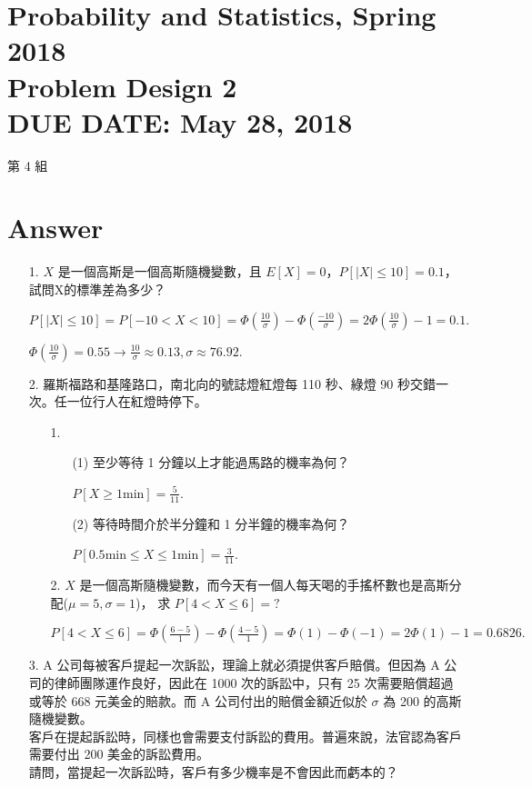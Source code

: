 \documentclass{article}
\newcommand{\hmwkClass}{Probability and Statistics, Spring 2018}
\newcommand{\hmwkTitle}{Problem Design 2}
\newcommand{\hmwkDueDate}{May 28, 2018}
\begin{document}
\thispagestyle{empty}
\section*{\hmwkClass \\
    \normalsize{\hmwkTitle} \\
    \normalsize{DUE DATE: \hmwkDueDate}
}

\hfill{第 4 組}


\section*{Answer}
\begin{enumerate}
    \item [1.] $X$ 是一個高斯是一個高斯隨機變數，且 $E[X] = 0$，$P[|X| \le 10] = 0.1$，試問X的標準差為多少？

    $P[|X| \le 10] = P[-10 < X < 10] = \Phi(\frac{10}{\sigma}) - \Phi(\frac{-10}{\sigma}) = 2\Phi(\frac{10}{\sigma}) - 1 = 0.1.$

    $\Phi(\frac{10}{\sigma}) = 0.55 \to \frac{10}{\sigma} \approx 0.13, \sigma \approx 76.92.$

    \item [2.] 羅斯福路和基隆路口，南北向的號誌燈紅燈每 110 秒、綠燈 90 秒交錯一次。任一位行人在紅燈時停下。

    \begin{enumerate}
        \item [1.]
        \begin{enumerate}
            \item [(1)] 至少等待 1 分鐘以上才能過馬路的機率為何？

            $P[X \ge 1\text{min}] = \frac{5}{11}$.
            
            \item [(2)] 等待時間介於半分鐘和 1 分半鐘的機率為何？
            
            $P[0.5\text{min} \le X \le 1\text{min}] = \frac{3}{11}$.
        \end{enumerate}
    
        \item [2.] $X$ 是一個高斯隨機變數，而今天有一個人每天喝的手搖杯數也是高斯分配($\mu = 5, \sigma = 1$)， 求 $P[4 < X \le 6] = ?$

        $P[4 < X \le 6] = \Phi(\frac{6 - 5}{1}) - \Phi(\frac{4 - 5}{1}) = \Phi(1) - \Phi(-1) = 2\Phi(1) - 1 = 0.6826.$
    \end{enumerate}

    \item [3.] A 公司每被客戶提起一次訴訟，理論上就必須提供客戶賠償。但因為 A 公司的律師團隊運作良好，因此在 1000 次的訴訟中，只有 25 次需要賠償超過或等於 668 元美金的賠款。而 A 公司付出的賠償金額近似於 $\sigma$ 為 200 的高斯隨機變數。\\
    客戶在提起訴訟時，同樣也會需要支付訴訟的費用。普遍來說，法官認為客戶需要付出 200 美金的訴訟費用。\\
    請問，當提起一次訴訟時，客戶有多少機率是不會因此而虧本的？
    

\end{enumerate}
\end{document}
